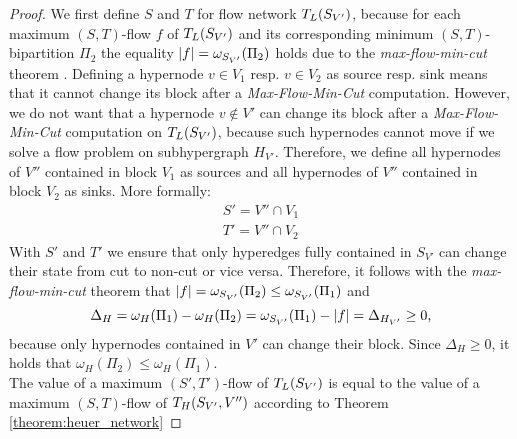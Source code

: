 \begin{proof}
We first define $S$ and $T$ for flow network
$T_L(S_{V'})$, because for each maximum $(S,T)$-flow $f$ of $T_L(S_{V'})$
and its corresponding minimum $(S,T)$-bipartition $\Pi_2$ the equality 
$|f| = \omega_{S_{V'}}(\Pi_2)$ holds due to the 
\emph{max-flow-min-cut} theorem \cite{ford1956maximal}. 
Defining a hypernode $v \in V_1$ resp. $v \in V_2$ as source resp. sink means that
it cannot change its block after a \emph{Max-Flow-Min-Cut} computation.
However, we do not want that a hypernode $v \notin V'$ can change its block after
a \emph{Max-Flow-Min-Cut} computation on $T_L(S_{V'})$, because such hypernodes
cannot move if we solve a flow problem on subhypergraph $H_{V'}$. Therefore, we define
all hypernodes of $V''$ contained in block $V_1$ as sources and all hypernodes of $V''$ contained
in block $V_2$ as sinks. More formally:
\begin{align*}
S' = V'' \cap V_1 \\
T' = V'' \cap V_2 
\end{align*}
With $S'$ and $T'$ we ensure that only hyperedges fully contained in $S_{V'}$ can
change their state from cut to non-cut or vice versa. Therefore, it follows with
the \emph{max-flow-min-cut} theorem \cite{ford1956maximal} that $|f| = \omega_{S_{V'}}(\Pi_2)
\le \omega_{S_{V'}}(\Pi_1)$ and 
\[\Delta_{H} = \omega_H(\Pi_1) - \omega_H(\Pi_2) = \omega_{S_{V'}}(\Pi_1) - |f| = \Delta_{H_{V'}} \ge 0 \text{,}\]
because only hypernodes contained in $V'$ can change their block. Since $\Delta_H \ge 0$,
it holds that $\omega_H(\Pi_2) \le \omega_H(\Pi_1)$.\\
The value of a maximum $(S',T')$-flow of $T_L(S_{V'})$ is equal to the value of a maximum
$(S,T)$-flow of $T_H(S_{V'},V'')$ according to Theorem \ref{theorem:heuer_network}

\end{proof}
